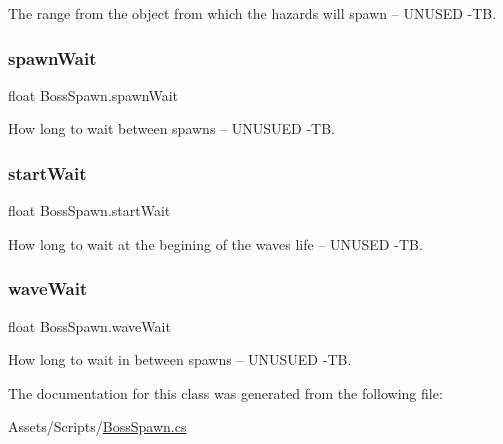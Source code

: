 The range from the object from which the hazards will spawn -- U\+N\+U\+S\+ED -\/TB. 

\mbox{\label{class_boss_spawn_aa09381d8f6025a408b13c7df16568ff0}} 
\subsubsection{\texorpdfstring{spawnWait}{spawnWait}}
{\footnotesize\ttfamily float Boss\+Spawn.\+spawn\+Wait}



How long to wait between spawns -- U\+N\+U\+S\+U\+ED -\/TB. 

\mbox{\label{class_boss_spawn_a96261ab1bd409caeb45cd8d59426b518}} 
\subsubsection{\texorpdfstring{startWait}{startWait}}
{\footnotesize\ttfamily float Boss\+Spawn.\+start\+Wait}



How long to wait at the begining of the wave\textquotesingle{}s life -- U\+N\+U\+S\+ED -\/TB. 

\mbox{\label{class_boss_spawn_a8a35320ba7ac1e86bf1c913647f8b09c}} 
\subsubsection{\texorpdfstring{waveWait}{waveWait}}
{\footnotesize\ttfamily float Boss\+Spawn.\+wave\+Wait}



How long to wait in between spawns -- U\+N\+U\+S\+U\+ED -\/TB. 



The documentation for this class was generated from the following file\+:\begin{DoxyCompactItemize}
\item 
Assets/\+Scripts/\mbox{\hyperlink{_boss_spawn_8cs}{Boss\+Spawn.\+cs}}\end{DoxyCompactItemize}
